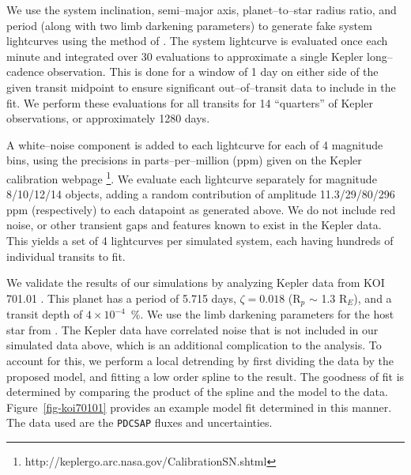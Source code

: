 \medskip
{\centerline{}}
\smallskip


We use the system inclination, semi--major axis, planet--to--star
radius ratio, and period (along with two limb darkening parameters) to
generate fake system lightcurves using the method of
\cite{2002ApJ...580L.171M}.  The system lightcurve is evaluated once
each minute and integrated over 30 evaluations to approximate a single
Kepler long--cadence observation.  This is done for a window of 1 day
on either side of the given transit midpoint to ensure significant
out--of--transit data to include in the fit.  We perform these
evaluations for all transits for 14 ``quarters'' of Kepler
observations, or approximately 1280 days.

A white--noise component is added to each lightcurve for each of 4
magnitude bins, using the precisions in parts--per--million (ppm)
given on the Kepler calibration
webpage \footnote{http://keplergo.arc.nasa.gov/CalibrationSN.shtml}.
We evaluate each lightcurve separately for magnitude 8/10/12/14
objects, adding a random contribution of amplitude 11.3/29/80/296 ppm
(respectively) to each datapoint as generated above.  We do not
include red noise, or other transient gaps and features known to exist
in the Kepler data.  This yields a set of 4 lightcurves per simulated
system, each having hundreds of individual transits to fit.

\medskip
{\centerline{}}
\smallskip

We validate the results of our simulations by analyzing Kepler data
from KOI 701.01 \citep[Kepler 62--b;][]{2013arXiv1304.7387B}.  This
planet has a period of 5.715 days, $\zeta = 0.018$ (R$_p$ $\sim$ 1.3
R$_E$), and a transit depth of $4 \times 10^{-4}$~\%.  We use the limb
darkening parameters for the host star from
\cite{2010A&A...510A..21S}.  The Kepler data have correlated noise
that is not included in our simulated data above, which is an
additional complication to the analysis.  To account for this, we
perform a local detrending by first dividing the data by the proposed
model, and fitting a low order spline to the result.  The goodness of
fit is determined by comparing the product of the spline and the model
to the data.  Figure~\ref{fig-koi70101} provides an example model fit
determined in this manner.  The data used are the {\tt PDCSAP} fluxes
and uncertainties.

